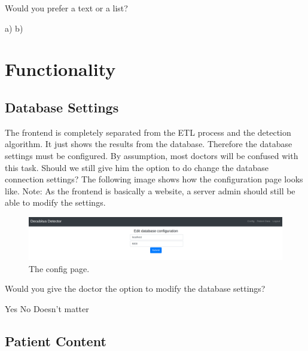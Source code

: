 \documentclass{exam}
\begin{document}
\begin{questions}

\question Would you prefer a text or a list?

\begin{checkboxes}
	\choice a)
	\choice b)
\end{checkboxes}

\end{questions}

\section*{Functionality}

\subsection*{Database Settings}

The frontend is completely separated from the ETL process and the detection algorithm. It just shows the results from the database. 
Therefore the database settings must be configured. By assumption, most doctors will be confused with this task. Should we still give him the option to 
do change the database connection settings? The following image shows how the configuration page looks like. 
Note: As the frontend is basically a website, a server admin should still be able to modify the settings.  

\begin{figure}[H]
	\centering
  \includegraphics[width=0.8\linewidth]{images/db.png}
	\captionsetup{labelformat=empty}
	\caption{The config page.}
  \label{fig:text}
\end{figure}

\begin{questions}
\question Would you give the doctor the option to modify the database settings?

\begin{checkboxes}
	\choice Yes
	\choice No
	\choice Doesn't matter
\end{checkboxes}

\end{questions}

\subsection*{Patient Content}
\end{document}
